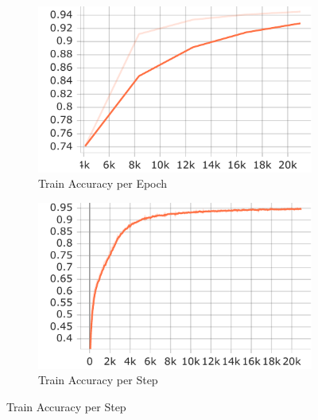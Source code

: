 \documentclass{article}
\begin{document}
\begin{figure}[H]
    \centering
    \begin{subfigure}{0.48\textwidth}  %
        \centering
        \includegraphics[width=\textwidth]{images/train_acc_epoch.pdf}
        \caption{Train Accuracy per Epoch}
        \label{fig:train_acc_epochs}
    \end{subfigure}
    \hfill
    \begin{subfigure}{0.48\textwidth}
        \centering
        \includegraphics[width=\textwidth]{images/train_acc_step.pdf}
        \caption{Train Accuracy per Step}
        \label{fig:train_acc_steps}
    \end{subfigure}
\end{figure}

\end{document}
